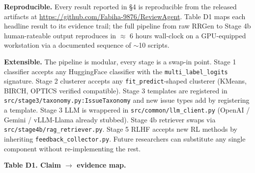 \documentclass[sigconf, nonacm, anonymous, balance=false]{acmart}
\begin{document}
\textbf{Reproducible.} Every result reported in §4 is reproducible from the released artifacts at \url{https://github.com/Fabiha-9876/ReviewAgent}. Table D1 maps each headline result to its evidence trail; the full pipeline from raw RRGen to Stage 4b human-rateable output reproduces in $\approx$ 6 hours wall-clock on a GPU-equipped workstation via a documented sequence of $\sim$10 scripts.

\textbf{Extensible.} The pipeline is modular, every stage is a swap-in point. Stage 1 classifier accepts any HuggingFace classifier with the \texttt{multi\_label\_logits} signature. Stage 2 clusterer accepts any \texttt{fit\_predict}-shaped clusterer (KMeans, BIRCH, OPTICS verified compatible). Stage 3 templates are registered in \texttt{src/stage3/taxonomy.py:IssueTaxonomy} and new issue types add by registering a template. Stage 3 LLM is wrappered in \texttt{src/common/llm\_client.py} (OpenAI / Gemini / vLLM-Llama already stubbed). Stage 4b retriever swaps via \texttt{src/stage4b/rag\_retriever.py}. Stage 5 RLHF accepts new RL methods by inheriting \texttt{feedback\_collector.py}. Future researchers can substitute any single component without re-implementing the rest.

\textbf{Table D1. Claim $\rightarrow$ evidence map.}
\end{document}
